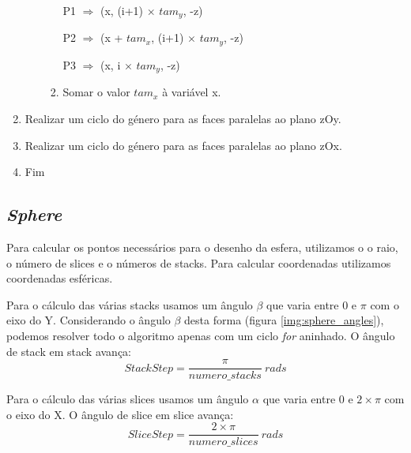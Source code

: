 \documentclass[a4paper]{article}
\begin{document}
\begin{enumerate}
\begin{enumerate}
\begin{enumerate}
      \vspace{0.5cm}

          \hspace{0.5cm} P1 $\Rightarrow$ (x, (i+1) $\times$ $tam_{y}$, -z)

      \vspace{0.2cm}

          \hspace{0.5cm} P2 $\Rightarrow$ (x + $tam_{x}$, (i+1) $\times$ $tam_{y}$, -z)

      \vspace{0.2cm}

          \hspace{0.5cm} P3 $\Rightarrow$ (x, i $\times$ $tam_{y}$, -z)

      \vspace{0.5cm}

      \item Somar o valor $tam_{x}$ à variável x.

      \end{enumerate}

    \end{enumerate}

    \item Realizar um ciclo do género para as faces paralelas ao plano zOy.
    \item Realizar um ciclo do género para as faces paralelas ao plano zOx.

    \item Fim
\end{enumerate}
\rmfamily

\newpage

\subsection{\textit{Sphere}}
\label{sec:sphere}

Para calcular os pontos necessários para o desenho da esfera, utilizamos o o raio, o número de slices e o números de stacks. Para calcular coordenadas utilizamos coordenadas esféricas.

Para o cálculo das várias stacks usamos um ângulo $\beta$ que varia entre 0 e $\pi$ com o eixo do Y. Considerando o ângulo $\beta$ desta forma (figura \ref{img:sphere_angles}), podemos resolver todo o algoritmo apenas com um ciclo \emph{for} aninhado. O ângulo de stack em stack avança: $$StackStep = \frac{\pi}{numero\_stacks}\ rads$$

Para o cálculo das várias slices usamos um ângulo $\alpha$ que varia entre 0 e $2\times\pi$ com o eixo do X. O ângulo de slice em slice avança: $$ SliceStep = \frac{2\times\pi}{numero\_slices}\ rads$$
\end{document}
